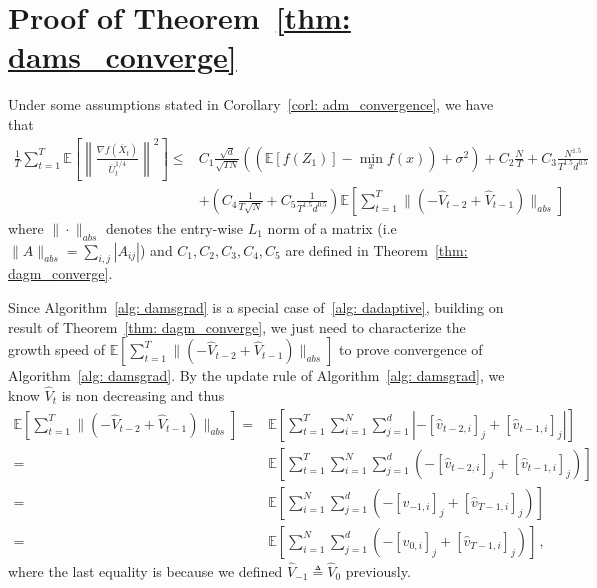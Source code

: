 \documentclass[11pt]{article}
\begin{document}
\clearpage


\section{Proof of Theorem~\ref{thm: dams_converge}} \label{app: proof_ams}

Under some assumptions stated in Corollary~\ref{corl: adm_convergence}, we have that
\begin{align}\label{eq: rep_thm1}
	 \frac{1}{T}\sum_{t=1}^T  \mathbb E \left [\left\|\frac{\nabla f( \overline X_{t})}{\overline U_{t}^{1/4}}\right\|^2  \right] 
	\leq  & C_1 \frac{\sqrt{d}}{\sqrt{TN}} \left(( \mathbb E  [f( Z_{1})]  -  \min_x  f(x)) +    \sigma^2 \right)  +  C_2 \frac{N}{T}  +  C_3 \frac{N^{1.5}}{T^{1.5}d^{0.5}} 
	\nonumber \\
    &+  \left(C_4 \frac{1}{T\sqrt{N}} +  C_5   \frac{1}{T^{1.5}d^{0.5}}\right)\mathbb E \left[ \sum_{t=1}^{T}   \|    (- \hat V_{t-2} + \hat V_{t-1} ) \|_{abs} \right] 
\end{align}
where $\| \cdot\|_{abs}$  denotes the entry-wise $L_1$ norm of a matrix (i.e $\| A\|_{abs} = \sum_{i,j}{|A_{ij}|}$) and $C_1, C_2 ,C_3, C_4, C_5$ are defined in Theorem~\ref{thm: dagm_converge}. 

Since Algorithm~\ref{alg: damsgrad} is a special case of~\ref{alg: dadaptive}, building on result of Theorem~\ref{thm: dagm_converge}, we just need to characterize the growth speed of $\mathbb E \left[ \sum_{t=1}^{T}   \|    (- \hat V_{t-2} + \hat V_{t-1} ) \|_{abs} \right]  $ to prove convergence of Algorithm~\ref{alg: damsgrad}.  By the update rule of Algorithm~\ref{alg: damsgrad}, we know $\hat V_t$ is non decreasing and thus
\begin{align}
\mathbb E \left[ \sum_{t=1}^{T}   \|    (- \hat V_{t-2} + \hat V_{t-1} ) \|_{abs} \right] = &\mathbb E \left[ \sum_{t=1}^{T}  \sum_{i=1}^N \sum_{j=1}^d    |- [\hat v_{t-2,i}]_j + [\hat v_{t-1,i}]_j | \right]  \nonumber  \\
= &\mathbb E \left[ \sum_{t=1}^{T}  \sum_{i=1}^N \sum_{j=1}^d    (- [\hat v_{t-2,i}]_j + [\hat v_{t-1,i}]_j ) \right]  \nonumber  \\
= &\mathbb E \left[   \sum_{i=1}^N \sum_{j=1}^d    (- [\hat v_{-1,i}]_j + [\hat v_{T-1,i}]_j ) \right]   \nonumber \\
= &\mathbb E \left[   \sum_{i=1}^N \sum_{j=1}^d    (- [\hat v_{0,i}]_j + [\hat v_{T-1,i}]_j ) \right] \, , 
\end{align}
where the last equality is because  we defined $\hat V_{-1} \triangleq \hat V_0$  previously.
\end{document}
